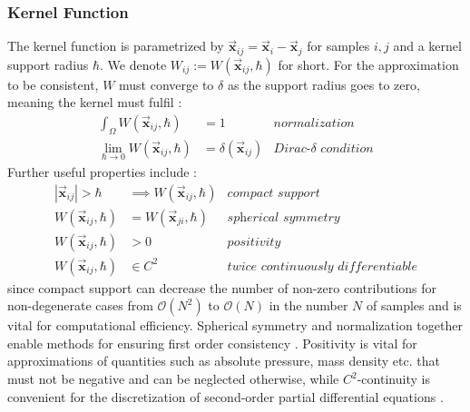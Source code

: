\documentclass[oneside, a4paper]{book}
\newcommand\abs[1]{\left|#1\right|}
\newcommand\vek[1]{\vec{\bm{#1}}}
\newcommand\br[1]{\left(#1\right)}
\begin{document}
    \subsubsection{Kernel Function}
    The kernel function is parametrized by $\vek{x}_{ij}=\vek{x}_i-\vek{x}_j$ for samples $i,j$ and a kernel support radius $\hbar$. We denote $W_{ij} := W(\vek{x}_{ij},\hbar) $ for short. For the approximation to be consistent, $W$ must converge to $\delta$ as the support radius goes to zero, meaning the kernel must fulfil \autocite{tutorial2019}:
    \begin{align}
      \int_\Omega W(\vek{x}_{ij},\hbar) &= 1 &\textit{normalization}\\
      \lim_{\hbar\rightarrow 0} W(\vek{x}_{ij},\hbar) &= \delta(\vek{x}_{ij}) &\textit{Dirac-$\delta$ condition}
    \end{align}
    Further useful properties include \autocite{tutorial2019}:
    \begin{align}
      \abs{\vek{x}_{ij}}>\hbar &\implies W(\vek{x}_{ij},\hbar) &\textit{compact support}\\
      W(\vek{x}_{ij},\hbar) &= W(\vek{x}_{ji}, \hbar) &\textit{spherical symmetry}\label{eq:sph-property-symmetry}\\
      W(\vek{x}_{ij},\hbar) &> 0 &\textit{positivity}\\
       W(\vek{x}_{ij},\hbar) &\in C^2 &\textit{twice continuously differentiable}
    \end{align}
    since compact support can decrease the number of non-zero contributions for non-degenerate cases from $\mathcal{O}\br{N^2}$ to $\mathcal{O}\br{N}$ in the number $N$ of samples and is vital for computational efficiency. Spherical symmetry and normalization together enable methods for ensuring first order consistency \autocite{tutorial2019}. Positivity is vital for approximations of quantities such as absolute pressure, mass density etc. that must not be negative and can be neglected otherwise, while $C^2$-continuity is convenient for the discretization of second-order partial differential equations \autocite{tutorial2019}.\\
\end{document}
